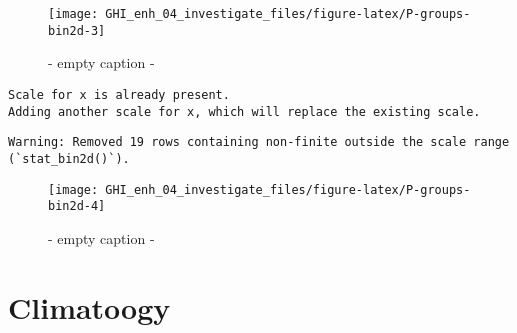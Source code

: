 \documentclass[
  10pt,
  a4paper,oneside]{article}
\begin{document}
\begin{figure}[H]

{\centering \texttt{[image: GHI\_enh\_04\_investigate\_files/figure-latex/P-groups-bin2d-3]} 

}

\caption{ - empty caption - }\label{fig:P-groups-bin2d-3}
\end{figure}

\begin{verbatim}
Scale for x is already present.
Adding another scale for x, which will replace the existing scale.
\end{verbatim}

\begin{verbatim}
Warning: Removed 19 rows containing non-finite outside the scale range
(`stat_bin2d()`).
\end{verbatim}

\begin{figure}[H]

{\centering \texttt{[image: GHI\_enh\_04\_investigate\_files/figure-latex/P-groups-bin2d-4]} 

}

\caption{ - empty caption - }\label{fig:P-groups-bin2d-4}
\end{figure}

\hypertarget{climatoogy}{%
\section{Climatoogy}\label{climatoogy}}
\end{document}
